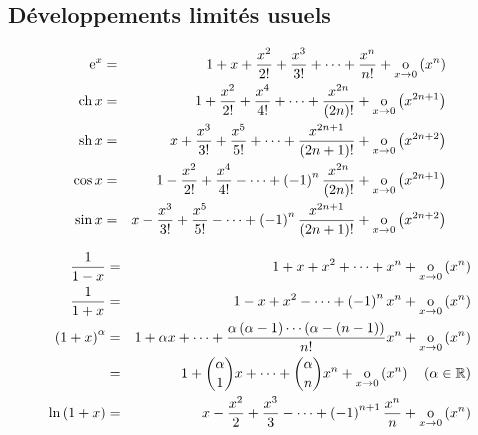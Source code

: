 \documentclass{magnoliaold}
\begin{document}
\subsection{Développements limités usuels}

\begin{proposition}[utile=-3]
\begin{eqnarray*}
{\rm e}^x &=& 1+x+\frac{x^2}{2!}+\frac{x^3}{3!}+\cdots+\frac{x^n}{n!}
        +\underset{x \rightarrow 0}{\text{o}}\left(x^n\right)\\
\operatorname{ch} x &=& 1+\frac{x^2}{2!}+\frac{x^4}{4!}+\cdots+\frac{x^{2n}}{\left(2n\right)!}
        +\underset{x \rightarrow 0}{\text{o}}\left(x^{2n+1}\right)\\
\operatorname{sh} x &=& x+\frac{x^3}{3!}+\frac{x^5}{5!}+\cdots+\frac{x^{2n+1}}{\left(2n+1\right)!}
        +\underset{x \rightarrow 0}{\text{o}}\left(x^{2n+2}\right)\\
\cos x &=& 1-\frac{x^2}{2!}+\frac{x^4}{4!}-\cdots+\left(-1\right)^n\frac{x^{2n}}{\left(2n\right)!}
        +\underset{x \rightarrow 0}{\text{o}}\left(x^{2n+1}\right)\\
\sin x &=& x-\frac{x^3}{3!}+\frac{x^5}{5!}-\cdots+
        \left(-1\right)^n\frac{x^{2n+1}}{\left(2n+1\right)!}+\underset{x \rightarrow 0}{\text{o}}\left(x^{2n+2}\right)
\end{eqnarray*}
\end{proposition}

\begin{proposition}[utile=-3]
\begin{eqnarray*}
\frac{1}{1-x} &=& 1+x+x^2+\cdots+x^n+\underset{x \rightarrow 0}{\text{o}}\left(x^n\right)\\
\frac{1}{1+x} &=& 1-x+x^2-\cdots+\left(-1\right)^nx^n+\underset{x \rightarrow 0}{\text{o}}\left(x^n\right)\\
\left(1+x\right)^\alpha &=& 1+\alpha x+\cdots+
  \frac{\alpha\left(\alpha-1\right)\cdots\left(\alpha-(n-1)\right)}{n!}x^n+\underset{x \rightarrow 0}{\text{o}}\left(x^n\right)\\
  &=& 1+\binom{\alpha}{1}x+\cdots+\binom{\alpha}{n}x^n+\underset{x \rightarrow 0}{\text{o}}\left(x^n\right)
    \quad \left(\alpha\in\mathbb{R}\right)\\
\ln\left(1+x\right) &=& x-\frac{x^2}{2}+\frac{x^3}{3}-\cdots+\left(-1\right)^{n+1}\frac{x^n}{n}
  +\underset{x \rightarrow 0}{\text{o}}\left(x^n\right)
\end{eqnarray*}
\end{proposition}

\end{document}
